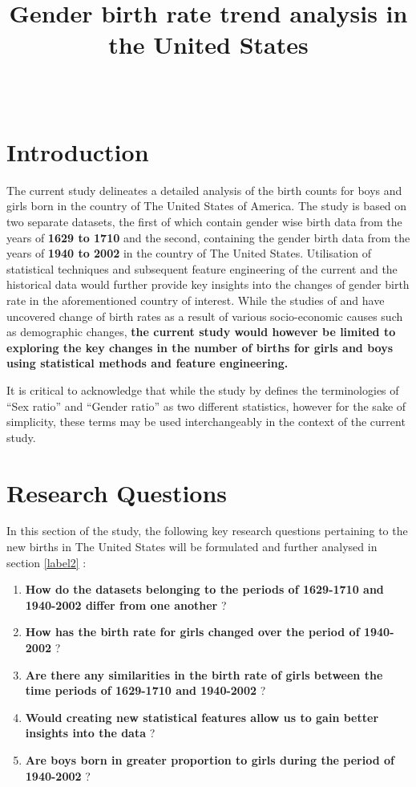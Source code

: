 \documentclass[11pt,a4paper,]{article}
\title{Gender birth rate trend analysis \newline in the United States\huge}
\author{\sf{\Large\textbf{Arindam Baruah}\\\large \href{mailto:abar0090@student.monash.edu}{\nolinkurl{abar0090@student.monash.edu}} (32779267)\\[0.5cm]}}
\date{\sf\Date~\Month~\Year}
\makeatletter
\providecommand{\tightlist}{%
  \setlength{\itemsep}{0pt}\setlength{\parskip}{0pt}}
\def\titlepage{\front{\expandafter{\@title}}{\@author}{\@organization}}
\makeatother
\begin{document}
\titlepage

{
\setcounter{tocdepth}{2}
\tableofcontents
}
\hypertarget{introduction}{%
\section{Introduction}\label{introduction}}

The current study delineates a detailed analysis of the birth counts for boys and girls born in the country of The United States of America. The study is based on two separate datasets, the first of which contain gender wise birth data from the years of \textbf{1629 to 1710} and the second, containing the gender birth data from the years of \textbf{1940 to 2002} in the country of The United States. Utilisation of statistical techniques and subsequent feature engineering of the current and the historical data would further provide key insights into the changes of gender birth rate in the aforementioned country of interest. While the studies of \textcite{mathews2005trend} and \textcite{owidgenderratio} have uncovered change of birth rates as a result of various socio-economic causes such as demographic changes, \textbf{the current study would however be limited to exploring the key changes in the number of births for girls and boys using statistical methods and feature engineering.}

It is critical to acknowledge that while the study by \textcite{pryzgoda2000definitions} defines the terminologies of ``Sex ratio'' and ``Gender ratio'' as two different statistics, however for the sake of simplicity, these terms may be used interchangeably in the context of the current study.

\hypertarget{label1}{%
\section{Research Questions}\label{label1}}

In this section of the study, the following key research questions pertaining to the new births in The United States will be formulated and further analysed in section \ref{label2} :

\begin{enumerate}
\def\labelenumi{\arabic{enumi}.}
\tightlist
\item
  \textbf{How do the datasets belonging to the periods of 1629-1710 and 1940-2002 differ from one another} ?
\item
  \textbf{How has the birth rate for girls changed over the period of 1940-2002} ?
\item
  \textbf{Are there any similarities in the birth rate of girls between the time periods of 1629-1710 and 1940-2002} ?
\item
  \textbf{Would creating new statistical features allow us to gain better insights into the data} ?
\item
  \textbf{Are boys born in greater proportion to girls during the period of 1940-2002} ?
\end{enumerate}
\end{document}
